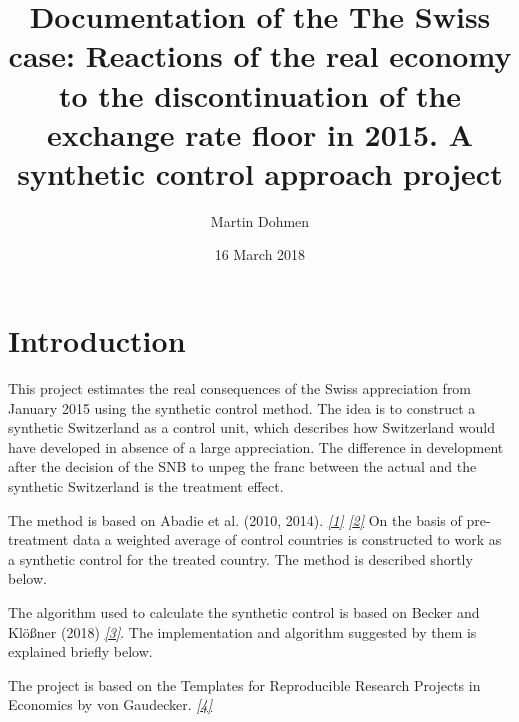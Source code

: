 \documentclass[a4paper,11pt,english]{sphinxmanual}
\title{Documentation of the The Swiss case: Reactions of the real economy to the discontinuation of the exchange rate floor in 2015. A synthetic control approach project}
\date{16 March 2018}
\author{Martin Dohmen}
\begin{document}
\maketitle
\tableofcontents
{}\label{index::doc}



\chapter{Introduction}
\label{introduction:introduction}\label{introduction:id1}\label{introduction:welcome-to-the-project-s-documentation-of-the-swiss-case-reactions-of-the-real-economy-to-the-discontinuation-of-the-exchange-rate-floor-in-2015-a-synthetic-control-approach}\label{introduction::doc}
This project estimates the real consequences of the Swiss appreciation from January 2015 using the synthetic control method. The idea is to construct a synthetic Switzerland
as a control unit, which describes how Switzerland would have developed in absence of a large appreciation. The difference in development after the decision of the SNB to unpeg the franc
between the actual and the synthetic Switzerland is the treatment effect.

The method is based on Abadie et al. (2010, 2014). \label{introduction:id2}{\hyperref[references:abadie2010]{\emph{{[}1{]}}}} \label{introduction:id3}{\hyperref[references:abadie2014]{\emph{{[}2{]}}}}
On the basis of pre-treatment data a weighted average of control countries is constructed to work as a synthetic control for the treated country.
The method is described shortly below.

The algorithm used to calculate the synthetic control is based on Becker and Klößner (2018) \label{introduction:id4}{\hyperref[references:becker2018]{\emph{{[}3{]}}}}.
The implementation and algorithm suggested by them is explained briefly below.

The project is based on the Templates for Reproducible Research Projects in Economics by von Gaudecker. \label{introduction:id5}{\hyperref[references:gaudeckereconprojecttemplates]{\emph{{[}4{]}}}}
\end{document}
